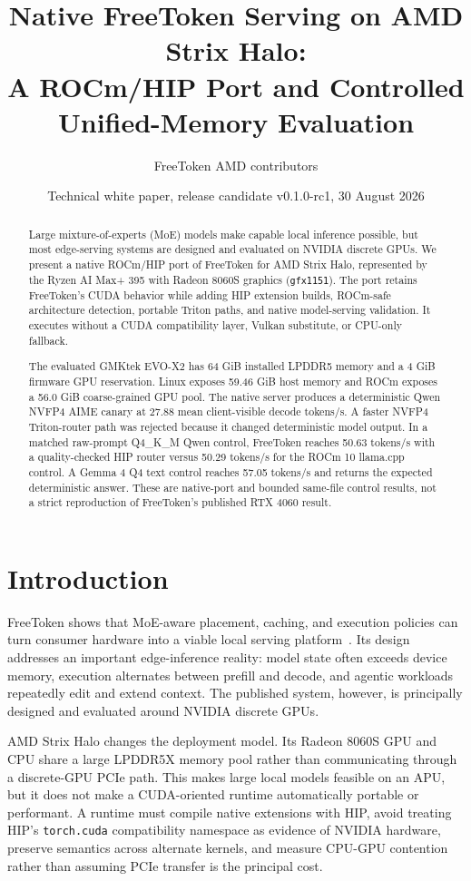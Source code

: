\documentclass[10pt,letterpaper,twocolumn]{article}
\title{Native FreeToken Serving on AMD Strix Halo:\\A ROCm/HIP Port and Controlled Unified-Memory Evaluation}
\author{FreeToken AMD contributors}
\date{Technical white paper, release candidate v0.1.0-rc1, 30 August 2026}
\begin{document}
\maketitle

\begin{abstract}
Large mixture-of-experts (MoE) models make capable local inference possible, but most edge-serving systems are designed and evaluated on NVIDIA discrete GPUs. We present a native ROCm/HIP port of FreeToken for AMD Strix Halo, represented by the Ryzen AI Max+ 395 with Radeon 8060S graphics (\texttt{gfx1151}). The port retains FreeToken's CUDA behavior while adding HIP extension builds, ROCm-safe architecture detection, portable Triton paths, and native model-serving validation. It executes without a CUDA compatibility layer, Vulkan substitute, or CPU-only fallback.

The evaluated GMKtek EVO-X2 has 64 GiB installed LPDDR5 memory and a 4 GiB firmware GPU reservation. Linux exposes 59.46 GiB host memory and ROCm exposes a 56.0 GiB coarse-grained GPU pool. The native server produces a deterministic Qwen NVFP4 AIME canary at 27.88 mean client-visible decode tokens/s. A faster NVFP4 Triton-router path was rejected because it changed deterministic model output. In a matched raw-prompt Q4\_K\_M Qwen control, FreeToken reaches 50.63 tokens/s with a quality-checked HIP router versus 50.29 tokens/s for the ROCm 10 llama.cpp control. A Gemma 4 Q4 text control reaches 57.05 tokens/s and returns the expected deterministic answer. These are native-port and bounded same-file control results, not a strict reproduction of FreeToken's published RTX 4060 result.
\end{abstract}

\section{Introduction}

FreeToken shows that MoE-aware placement, caching, and execution policies can turn consumer hardware into a viable local serving platform~\cite{freetoken}. Its design addresses an important edge-inference reality: model state often exceeds device memory, execution alternates between prefill and decode, and agentic workloads repeatedly edit and extend context. The published system, however, is principally designed and evaluated around NVIDIA discrete GPUs.

AMD Strix Halo changes the deployment model. Its Radeon 8060S GPU and CPU share a large LPDDR5X memory pool rather than communicating through a discrete-GPU PCIe path. This makes large local models feasible on an APU, but it does not make a CUDA-oriented runtime automatically portable or performant. A runtime must compile native extensions with HIP, avoid treating HIP's \texttt{torch.cuda} compatibility namespace as evidence of NVIDIA hardware, preserve semantics across alternate kernels, and measure CPU-GPU contention rather than assuming PCIe transfer is the principal cost.
\end{document}
